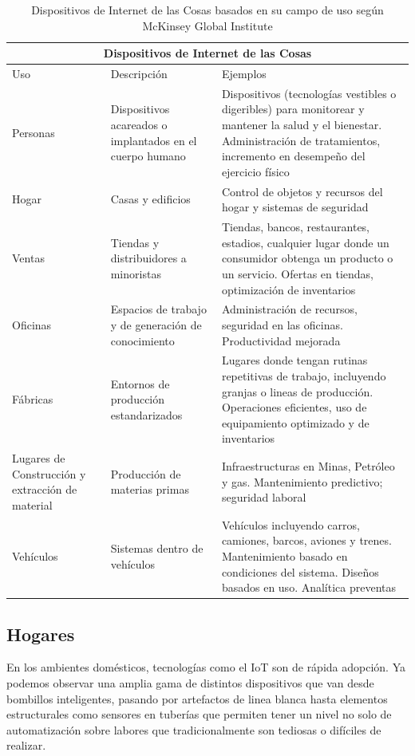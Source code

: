 \begin{table}[!htb]
\centering
\begin{tabular}{| m{3.2cm}| m{4.5cm}| m{6.6cm}|}
\hline
\multicolumn{3}{|c|}{Dispositivos de Internet de las Cosas} \\
\hline 
\centering Uso & \centering Descripción & \centering Ejemplos \tabularnewline \hline
Personas & Dispositivos acareados o implantados en el cuerpo humano & Dispositivos (tecnologías vestibles o digeribles) para monitorear y mantener la salud y el bienestar. Administración de tratamientos, incremento en desempeño del ejercicio físico \\ \hline
Hogar & Casas y edificios & Control de objetos y recursos del hogar y sistemas de seguridad\\ \hline
Ventas & Tiendas y distribuidores a minoristas & Tiendas, bancos, restaurantes, estadios, cualquier lugar donde un consumidor obtenga un producto o un servicio. Ofertas en tiendas, optimización de inventarios \\ \hline
Oficinas & Espacios de trabajo y de generación de conocimiento & Administración de recursos, seguridad en las oficinas. Productividad mejorada \\ \hline
Fábricas & Entornos de producción estandarizados & Lugares donde tengan rutinas repetitivas de trabajo, incluyendo granjas o lineas de producción. Operaciones eficientes, uso de equipamiento optimizado y de inventarios \\ \hline
Lugares de Construcción y extracción de material & Producción de materias primas & Infraestructuras en Minas, Petróleo y gas. Mantenimiento predictivo; seguridad laboral \\ \hline
Vehículos & Sistemas dentro de vehículos & Vehículos incluyendo carros, camiones, barcos, aviones y trenes. Mantenimiento basado en condiciones del sistema. Diseños basados en uso. Analítica preventas \\ \hline
\end{tabular}
\caption{Dispositivos de Internet de las Cosas basados en su campo de uso según McKinsey Global Institute\cite{tablaiot}}
\label{tabla:categorias_dispositivos}
\end{table}

\subsection{Hogares}
En los ambientes domésticos, tecnologías como el IoT son de rápida adopción. Ya podemos observar una amplia gama de distintos dispositivos que van desde bombillos inteligentes, pasando por artefactos de linea blanca hasta elementos estructurales como sensores en tuberías que permiten tener un nivel no solo de automatización sobre labores que tradicionalmente son tediosas o difíciles de realizar.\\

